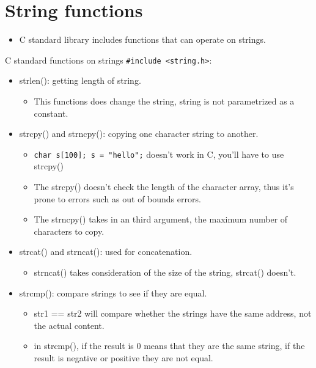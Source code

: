 \section{String functions}
\begin{itemize}
    \item C standard library includes functions that can operate on strings. 
\end{itemize}
C standard functions on strings \texttt{#include <string.h>}: 
\begin{itemize}
    \item strlen(): getting length of string. 
        \begin{itemize}
            \item This functions does change the string, string is not parametrized as a constant. 
        \end{itemize}
    \item strcpy() and strncpy(): copying one character string to another. 
        \begin{itemize}
            \item \texttt{char s[100]; s = "hello";} doesn't work in C, you'll have to use strcpy()
            \item The strcpy() doesn't check the length of the character array, thus it's prone to errors such as out of bounds errors.
            \item The strncpy() takes in an third argument, the maximum number of characters to copy. 
        \end{itemize}
    \item strcat() and strncat(): used for concatenation.
        \begin{itemize}
            \item strncat() takes consideration of the size of the string, strcat() doesn't. 
        \end{itemize}
    \item strcmp(): compare strings to see if they are equal. 
        \begin{itemize}
            \item str1 == str2 will compare whether the strings have the same address, not the actual content.  
            \item in strcmp(), if the result is 0 means that they are the same string, if the result is negative or positive they are not equal. 

\end{itemize}
\end{itemize}
